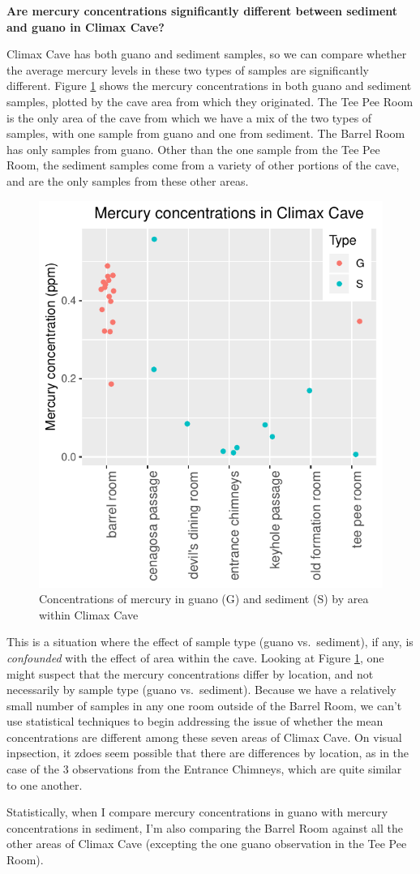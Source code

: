 \documentclass[11pt]{article}
\begin{document}
\noindent \textbf{Are mercury concentrations significantly different
  between sediment and guano in Climax Cave?}

Climax Cave has both guano and sediment samples, so we can compare
whether the average mercury levels in these two types of samples are
significantly different.  Figure \ref{fig:dotplot_climaxcave_by_area}
shows the mercury concentrations in both guano and sediment samples,
plotted by the cave area from which they originated.  The Tee Pee Room
is the only area of the cave from which we have a mix of the two types
of samples, with one sample from guano and one from sediment.  The
Barrel Room has only samples from guano.  Other than the one sample
from the Tee Pee Room, the sediment samples come from a variety of
other portions of the cave, and are the only samples from these other
areas.
\begin{figure}[hb]
  \centering
  \includegraphics{dotplot_climaxcave_by_area}
  \caption{Concentrations of mercury in guano (G) and sediment (S) by area within Climax Cave}
  \label{fig:dotplot_climaxcave_by_area}
\end{figure}

This is a situation where the effect of sample type (guano
vs.\ sediment), if any, is \textit{confounded} with the effect of area
within the cave.  Looking at Figure
\ref{fig:dotplot_climaxcave_by_area}, one might suspect that the
mercury concentrations differ by location, and not necessarily by
sample type (guano vs.\ sediment).  Because we have a relatively small
number of samples in any one room outside of the Barrel Room, we can't
use statistical techniques to begin addressing the issue of whether
the mean concentrations are different among these seven areas of
Climax Cave.  On visual inpsection, it zdoes seem possible that there
are differences by location, as in the case of the 3 observations from
the Entrance Chimneys, which are quite similar to one another.

Statistically, when I compare mercury concentrations in guano with
mercury concentrations in sediment, I'm also comparing the Barrel Room
against all the other areas of Climax Cave (excepting the one guano
observation in the Tee Pee Room). 
\end{document}
